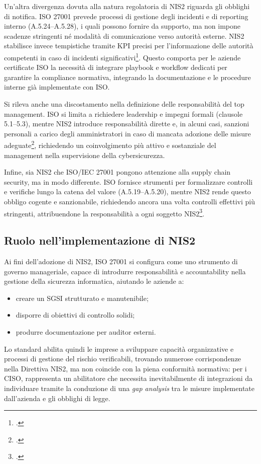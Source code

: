 Un’altra divergenza dovuta alla natura regolatoria di NIS2 riguarda gli obblighi di notifica. ISO 27001 prevede processi di gestione degli incidenti e di reporting interno (A.5.24--A.5.28), 
i quali possono fornire da supporto, ma non impone scadenze stringenti né modalità di comunicazione verso autorità esterne. 
NIS2 stabilisce invece tempistiche tramite KPI precisi per l'informazione delle autorità competenti in caso di incidenti significativi\footcite[art. 23]{nis2-directive}.
Questo comporta per le aziende certificate ISO la necessità di integrare playbook e workflow dedicati per garantire la compliance normativa, integrando
la documentazione e le procedure interne già implementate con ISO.

Si rileva anche una discostamento nella definizione delle responsabilità del top management. ISO si limita a richiedere leadership e impegni formali (clausole 5.1--5.3), 
mentre NIS2 introduce responsabilità dirette e, in alcuni casi, sanzioni personali a carico degli amministratori in caso di mancata adozione delle misure 
adeguate\footcite[art. 20]{nis2-directive}, richiedendo un coinvolgimento più attivo e sostanziale del management nella supervisione della cybersicurezza.

Infine, sia NIS2 che ISO/IEC 27001 pongono attenzione alla supply chain security, ma in modo differente. 
ISO fornisce strumenti per formalizzare controlli e verifiche lungo la catena del valore (A.5.19--A.5.20), mentre NIS2 rende questo obbligo 
cogente e sanzionabile, richiedendo ancora una volta controlli effettivi più stringenti, attribuendone la 
responsabilità a ogni soggetto NIS2\footcite[art. 21]{nis2-directive}.


\subsection{Ruolo nell'implementazione di NIS2}
Ai fini dell'adozione di NIS2, ISO 27001 si configura come uno strumento di governo manageriale, capace di introdurre responsabilità
e accountability nella gestione della sicurezza informatica, aiutando le aziende a:
\begin{itemize}
    \item creare un SGSI strutturato e manutenibile;
    \item disporre di obiettivi di controllo solidi;
    \item produrre documentazione per auditor esterni.
\end{itemize}
Lo standard abilita quindi le imprese a sviluppare capacità organizzative e processi di 
gestione del rischio verificabili, trovando numerose corrispondenze nella Direttiva NIS2, ma non coincide con la piena conformità normativa: 
per i CISO, rappresenta un abilitatore che necessita inevitabilmente di integrazioni da individuare tramite la conduzione di una 
\textit{gap analysis} tra le misure implementate dall'azienda e gli obblighi di legge.


